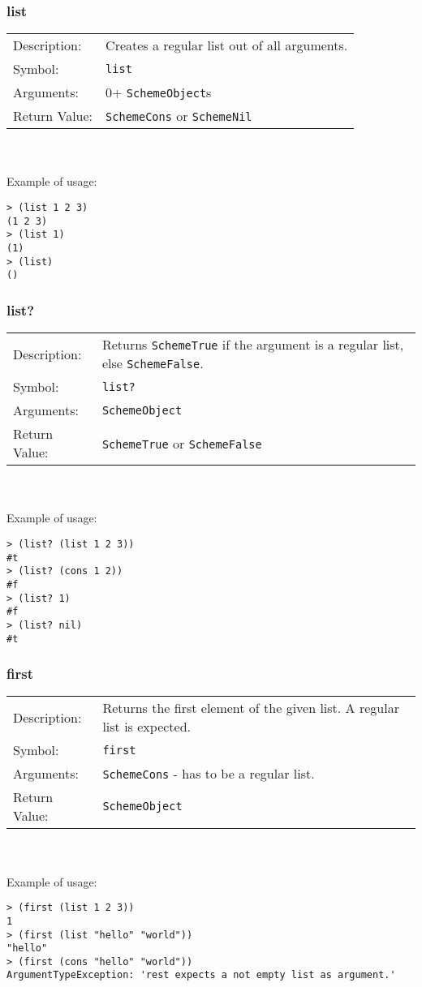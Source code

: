\documentclass[12pt,a4paper]{scrartcl}
\begin{document}
\subsubsection*{list}
\begin{tabular}{l  p{13cm}}
Description: & Creates a regular list out of all arguments.\\
Symbol: & \lstinline{list}\\
Arguments: & 0+ \lstinline{SchemeObject}s\\
Return Value: & \lstinline{SchemeCons} or \lstinline{SchemeNil}
\end{tabular}
\\
\\
Example of usage:
\begin{lstlisting}
> (list 1 2 3)
(1 2 3)
> (list 1)
(1)
> (list)
()
\end{lstlisting}


\subsubsection*{list?}
\begin{tabular}{l  p{13cm}}
Description: & Returns \lstinline{SchemeTrue} if the argument is a regular list, else \lstinline{SchemeFalse}.\\
Symbol: & \lstinline{list?}\\
Arguments: & \lstinline{SchemeObject}\\
Return Value: & \lstinline{SchemeTrue} or \lstinline{SchemeFalse}
\end{tabular}
\\
\\
Example of usage:
\begin{lstlisting}
> (list? (list 1 2 3))
#t
> (list? (cons 1 2))
#f
> (list? 1)
#f
> (list? nil)
#t
\end{lstlisting}


\subsubsection*{first}
\begin{tabular}{l  p{13cm}}
Description: & Returns the first element of the given list. A regular list is expected.\\
Symbol: & \lstinline{first}\\
Arguments: & \lstinline{SchemeCons} - has to be a regular list.\\
Return Value: & \lstinline{SchemeObject}
\end{tabular}
\\
\\
Example of usage:
\begin{lstlisting}
> (first (list 1 2 3))
1
> (first (list "hello" "world"))
"hello"
> (first (cons "hello" "world"))
ArgumentTypeException: 'rest expects a not empty list as argument.' 
\end{lstlisting}
\end{document}
